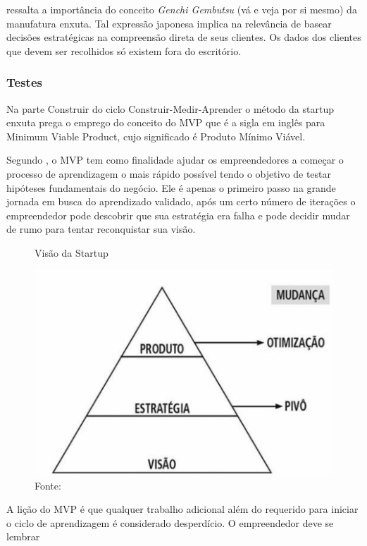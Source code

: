  ressalta a importância do conceito \textit {Genchi Gembutsu} (vá e veja por si mesmo) da manufatura enxuta. Tal expressão japonesa implica na relevância de basear decisões estratégicas na compreensão direta de seus clientes. Os dados dos clientes que devem ser recolhidos só existem fora do escritório.

\subsubsection{Testes}
\label{cha:testes}

Na parte Construir do ciclo Construir-Medir-Aprender o método da startup enxuta prega o emprego do conceito do MVP que é a sigla em inglês para Minimum Viable Product, cujo significado é Produto Mínimo Viável.

Segundo , o MVP tem como finalidade ajudar os empreendedores a começar o processo de aprendizagem o mais rápido possível tendo o objetivo de testar hipóteses fundamentais do negócio. Ele é apenas o primeiro passo na grande jornada em busca do aprendizado validado, após um certo número de iterações o empreendedor pode descobrir que sua estratégia era falha e pode decidir mudar de rumo para tentar reconquistar sua visão.

\begin{figure}[H]
\caption{Visão da Startup}
\centerline{\includegraphics[scale=0.5]{img/pivotar}}
\label{fig:pivotar}
\caption* {Fonte: }
\end{figure}

A lição do MVP é que qualquer trabalho adicional além do requerido para iniciar o ciclo de aprendizagem é considerado desperdício. O empreendedor deve se lembrar

